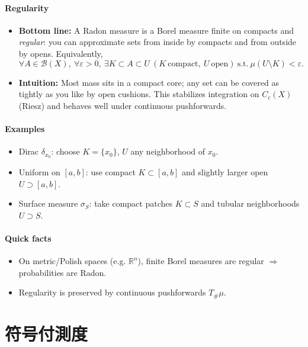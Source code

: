 \documentclass[dvipdfmx,autodetect-engine]{article}
\begin{document}
\paragraph{Regularity}
\begin{itemize}
  \item \textbf{Bottom line:} A Radon measure is a Borel measure finite on compacts and \emph{regular}: you can approximate sets from inside by compacts and from outside by opens. Equivalently,
  \[
  \forall A\in\mathcal{B}(X),\ \forall \varepsilon>0,\ \exists K\subset A\subset U\ (K\ \text{compact},\ U\ \text{open})\ \text{s.t.}\ \mu(U\setminus K)<\varepsilon.
  \]
  \item \textbf{Intuition:} Most mass sits in a compact core; any set can be covered as tightly as you like by open cushions. This stabilizes integration on \(C_c(X)\) (Riesz) and behaves well under continuous pushforwards.
\end{itemize}

\paragraph{Examples}
\begin{itemize}
  \item Dirac \(\delta_{x_0}\): choose \(K=\{x_0\}\), \(U\) any neighborhood of \(x_0\).
  \item Uniform on \([a,b]\): use compact \(K\subset[a,b]\) and slightly larger open \(U\supset[a,b]\).
  \item Surface measure \(\sigma_S\): take compact patches \(K\subset S\) and tubular neighborhoods \(U\supset S\).
\end{itemize}

\paragraph{Quick facts}
\begin{itemize}
  \item On metric/Polish spaces (e.g. \(\mathbb{R}^n\)), finite Borel measures are regular \(\Rightarrow\) probabilities are Radon.
  \item Regularity is preserved by continuous pushforwards \(T_\#\mu\).
\end{itemize}


\vspace{1em}

\section*{符号付測度}
\end{document}
